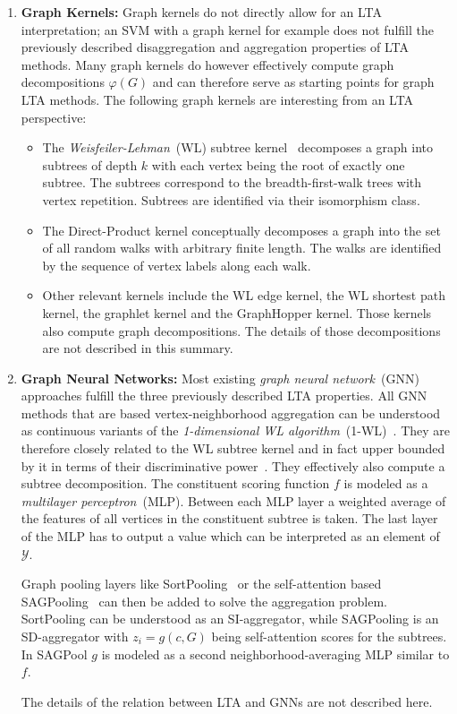 \documentclass[12pt]{scrartcl}
\begin{document}
\begin{enumerate}[label=\textbf{\arabic*.}]
	\item \textbf{Graph Kernels:}
		Graph kernels do not directly allow for an LTA interpretation;
		an SVM with a graph kernel for example does not fulfill the previously described disaggregation and aggregation properties of LTA methods.
		Many graph kernels do however effectively compute graph decompositions $\varphi(G)$ and can therefore serve as starting points for graph LTA methods.
		The following graph kernels are interesting from an LTA perspective:
		\begin{itemize}
			\item The \textit{Weisfeiler-Lehman}~(WL) subtree kernel~\cite{Shervashidze2011} decomposes a graph into subtrees of depth $k$ with each vertex being the root of exactly one subtree.
				The subtrees correspond to the breadth-first-walk trees with vertex repetition.
				Subtrees are identified via their isomorphism class.
			\item The Direct-Product kernel conceptually decomposes a graph into the set of all random walks with arbitrary finite length.
				The walks are identified by the sequence of vertex labels along each walk.
			\item Other relevant kernels include the WL edge kernel, the WL shortest path kernel, the graphlet kernel and the GraphHopper kernel.
				Those kernels also compute graph decompositions.
				The details of those decompositions are not described in this summary.
		\end{itemize}
	\item \textbf{Graph Neural Networks:}
		Most existing \textit{graph neural network}~(GNN) approaches fulfill the three previously described LTA properties.
		All GNN methods that are based vertex-neighborhood aggregation can be understood as continuous variants of the \textit{1-dimensional WL algorithm}~(1-WL)~\cite{Weisfeiler1968}.
		They are therefore closely related to the WL subtree kernel and in fact upper bounded by it in terms of their discriminative power~\cite{Xu2018}\cite{Morris2018}.
		They effectively also compute a subtree decomposition.
		The constituent scoring function $f$ is modeled as a \textit{multilayer perceptron}~(MLP).\@
		Between each MLP layer a weighted average of the features of all vertices in the constituent subtree is taken.
		The last layer of the MLP has to output a value which can be interpreted as an element of $\mathcal{Y}$.

		Graph pooling layers like SortPooling~\cite{Zhang2018} or the self-attention based SAGPooling~\cite{Lee2019} can then be added to solve the aggregation problem.
		SortPooling can be understood as an SI-aggregator, while SAGPooling is an SD-aggregator with $z_i = g(c, G)$ being self-attention scores for the subtrees.
		In SAGPool $g$ is modeled as a second neighborhood-averaging MLP similar to $f$.

		The details of the relation between LTA and GNNs are not described here.
\end{enumerate}
\end{document}
